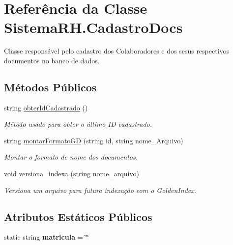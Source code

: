 \hypertarget{class_sistema_r_h_1_1_cadastro_docs}{
\section{Referência da Classe SistemaRH.CadastroDocs}
\label{class_sistema_r_h_1_1_cadastro_docs}
}


Classe responsável pelo cadastro dos Colaboradores e dos sesus respectivos documentos no banco de dados.  


\subsection*{Métodos Públicos}
\begin{DoxyCompactItemize}
\item 
string \hyperlink{class_sistema_r_h_1_1_cadastro_docs_adaa98da56648d5c3594b709073059b6c}{obterIdCadastrado} ()
\begin{DoxyCompactList}\small\item\em Método usado para obter o último ID cadastrado. \item\end{DoxyCompactList}\item 
string \hyperlink{class_sistema_r_h_1_1_cadastro_docs_aa3b1733fc1dd88b6c0f5a4178bbaefbd}{montarFormatoGD} (string id, string nome\_\-Arquivo)
\begin{DoxyCompactList}\small\item\em Montar o formato de nome dos documentos. \item\end{DoxyCompactList}\item 
void \hyperlink{class_sistema_r_h_1_1_cadastro_docs_ab45ed5324701875b1199c2c5e95954af}{versiona\_\-indexa} (string nome\_\-arquivo)
\begin{DoxyCompactList}\small\item\em Versiona um arquivo para futura indexação com o GoldenIndex. \item\end{DoxyCompactList}\end{DoxyCompactItemize}
\subsection*{Atributos Estáticos Públicos}
\begin{DoxyCompactItemize}
\item 
\hypertarget{class_sistema_r_h_1_1_cadastro_docs_ab215c43480a0dcbcda460ec5032a1e73}{
static string {\bfseries matricula} = \char`\"{}\char`\"{}}
\label{class_sistema_r_h_1_1_cadastro_docs_ab215c43480a0dcbcda460ec5032a1e73}

\end{DoxyCompactItemize}
